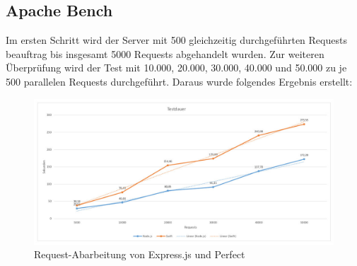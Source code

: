 \begin{figure}[H]
\end{figure}

\subsection{Apache Bench}

Im ersten Schritt wird der Server mit 500 gleichzeitig durchgeführten Requests beauftrag bis insgesamt 5000 Requests abgehandelt wurden. Zur weiteren Überprüfung wird der Test mit 10.000, 20.000, 30.000, 40.000 und 50.000 zu je 500 parallelen Requests durchgeführt. Daraus wurde folgendes Ergebnis erstellt:

\begin{figure}[H]
\centering
\includegraphics[keepaspectratio, scale = 0.4]{images/time.jpg}
\caption{Request-Abarbeitung von Express.js und Perfect}
\label{fig:time}
\end{figure}

